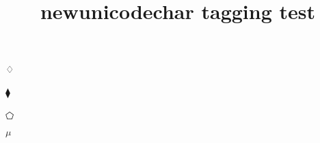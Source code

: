\documentclass{article}
\title{newunicodechar tagging test}
\begin{document}
♢

⧫

⬠

$μ$
\end{document}
